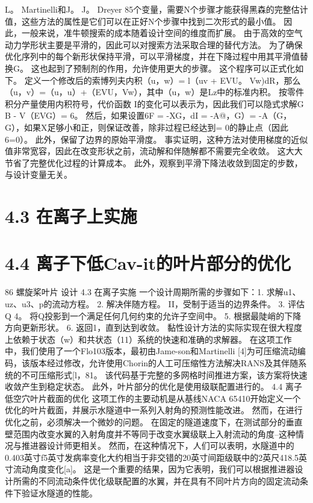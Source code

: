 \documentclass[UTF8,11pt,a4paper,openany,fontset=fandol]{ctexbook}
\begin{document}
L。 Martinelli和J。 J。 Dreyer 85个变量，需要N个步骤才能获得黑森的完整估计值，这些方法的属性是它们可以在正好N个步骤中找到二次形式的最小值。 因此，一般来说，准牛顿搜索的成本随着设计空间的维度而扩展。 由于高效的空气动力学形状主要是平滑的，因此可以对搜索方法采取合理的替代方法。 为了确保优化序列中的每个新形状保持平滑，可以平滑梯度，并在下降过程中用其平滑值替换G。 这也起到了预制剂的作用，允许使用更大的步骤。 这个程序可以正式化如下。 定义一个修改后的索博列夫内积（u，w）= l（uv + EVU。 Vw)dR，那么（u，v）=（u，u）+（EVU，Vw），其中（u，w）是Lz中的标准内积。 按零件积分产量使用内积符号，代价函数 I的变化可以表示为，因此我们可以隐式求解G B - V（EVG）= 6。 然后，如果设置6F = -XG，dI = -A@，G）= -A（G，G），如果X足够小和正，则保证改善，除非过程已经达到= 0的静止点（因此6=0）。 此外，保留了边界的原始平滑度。 事实证明，这种方法对使用梯度的近似值非常宽容，因此在改变形状之前，流动解和伴随解都不需要完全收敛。 这大大节省了完整优化过程的计算成本。 此外，观察到平滑下降法收敛到固定的步数，与设计变量无关。

\section{4.3 在离子上实施}
\section{4.4 离子下低Cav-it的叶片部分的优化}
86 螺旋桨叶片 设计 4.3 在离子实施 一个设计周期所需的步骤如下：1. 求解u1、uz、u3、p的流动方程。 2. 解决伴随方程。 II，受制于适当的边界条件。 3. 评估Q 4。 将Q投影到一个满足任何几何约束的允许子空间中。 5. 根据最陡峭的下降方向更新形状。 6. 返回1，直到达到收敛。 黏性设计方法的实际实现在很大程度上依赖于状态（w）和共状态（11）系统的快速和准确的求解器。 在这项工作中，我们使用了一个Flo103版本，最初由Jame-son和Martinelli [4]为可压缩流动编码，该版本经过修改，允许使用Chorin的人工可压缩性方法解决RANS及其伴随系统的不可压缩形式[l，81。 该代码基于完整的多网格时间推进方案，该方案将快速收敛产生到稳定状态。 此外，叶片部分的优化是使用级联配置进行的。 4.4 离子低空穴叶片截面的优化 这项工作的主要动机是从基线NACA 65410开始定义一个优化的叶片截面，并展示水隧道中一系列入射角的预测性能改进。 然而，在进行优化之前，必须解决一个微妙的问题。 在固定的隧道速度下，在测试部分的垂直壁范围内改变水翼的入射角度并不等同于改变水翼级联上入射流动的角度--这种情况与推进器设计师更相关。 然而，在这种情况下，人们可以表明，水隧道中的0.403英寸f5英寸发病率变化大约相当于非交错的20英寸间距级联中的2英尺418.5英寸流动角度变化[a]。 这是一个重要的结果，因为它表明，我们可以根据推进器设计所需的不同流动条件优化级联配置的水翼，并在具有不同叶片方向的固定流动条件下验证水隧道的性能。
\end{document}
